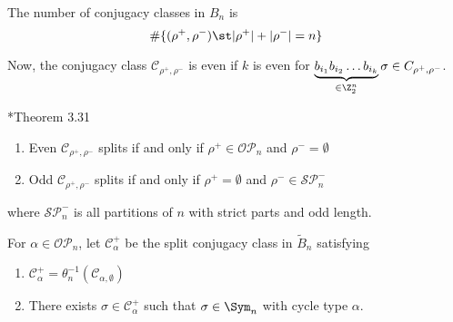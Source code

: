 \documentclass[11pt,leqno,oneside]{amsbook}
\newcommand{\OP}{\mathcal{OP}} %
\newcommand{\SP}{\mathcal{SP}} %
\newcommand{\CC}{\mathcal{C}} %
\numberwithin{thm}{section}
\begin{document}
\begin{cor}
  The number of conjugacy classes in \(B_n\) is \[
    \#\{(\rho^+,\rho^-) \st |\rho^+|+|\rho^-| = n\}
  \]
\end{cor}
Now, the conjugacy class \(\CC_{\rho^+,\rho^-}\) is even if \(k\) is
even for \(\underbrace{b_{i_1} b_{i_2} \ldots b_{i_k}}_{\in \Z_2^n} \sigma \in
C_{\rho^+,\rho^-}\).
\begin{thm}[Read]
  \cite{cheng-wang}*{Theorem 3.31}
  \begin{enumerate}
  \item Even \(\CC_{\rho^+,\rho^-}\) splits if and only if \(\rho^+ \in
    \OP_n\) and \(\rho^- = \emptyset\)
  \item Odd \(\CC_{\rho^+,\rho^-}\) splits if and only if \(\rho^+ =
    \emptyset\) and \(\rho^- \in \SP_n^- \)
  \end{enumerate}
  where \(\SP_n^-\) is all partitions of \(n\) with strict parts and
  odd length.
\end{thm}
\begin{defn}
  For \(\alpha \in \OP_n\), let \(\CC_\alpha^+\) be the split
  conjugacy class in \(\tilde{B}_n\) satisfying
  \begin{enumerate}
  \item \(\CC_\alpha^+ = \theta_n^{-1}(\CC_{\alpha,\emptyset})\)
  \item There exists \(\sigma \in \CC_\alpha^+\) such that \(\sigma \in
    \Sym_n\) with cycle type \(\alpha\).
  \end{enumerate}
\end{defn}
\end{document}

